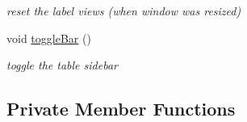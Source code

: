 \begin{DoxyCompactItemize}
\begin{DoxyCompactList}\small\item\em reset the label views (when window was resized) \end{DoxyCompactList}\item 
\hypertarget{class_main_window_afade4be02b38062cd3a439f02abdf3bc}{}void \hyperlink{class_main_window_afade4be02b38062cd3a439f02abdf3bc}{toggle\+Bar} ()\label{class_main_window_afade4be02b38062cd3a439f02abdf3bc}

\begin{DoxyCompactList}\small\item\em toggle the table sidebar \end{DoxyCompactList}\end{DoxyCompactItemize}
\subsection*{Private Member Functions}
